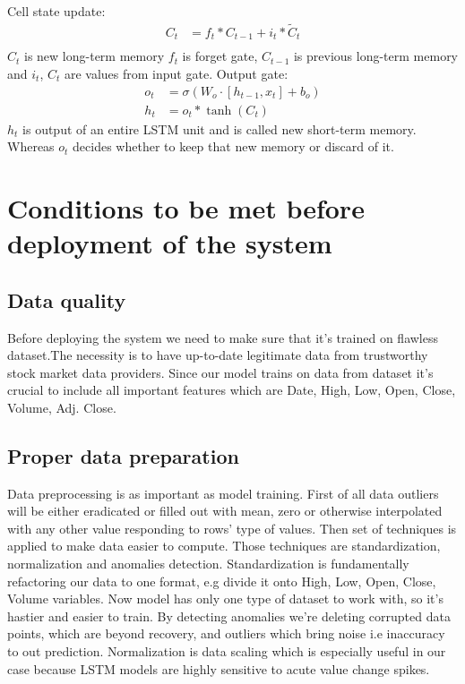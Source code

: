 \documentclass[10pt,twoside,english,a4paper]{article}
\begin{document}
\newline Cell state update:
\begin{align*}
    C_t &= f_t * C_{t-1} + i_t * \tilde{C}_t \\
\end{align*}
$C_t$ is new long-term memory $f_t$ is forget gate, $C_{t-1}$ is previous long-term memory and $i_t$, $C_t$ are values from input gate.
\newline Output gate:
\begin{align*}
    o_t &= \sigma(W_o \cdot [h_{t-1}, x_t] + b_o) \\
    h_t &= o_t * \tanh(C_t)
\end{align*}
$h_t$ is output of an entire LSTM unit and is called new short-term memory. Whereas $o_t$ decides whether to keep that new memory or discard of it.
\section{Conditions to be met before deployment of the system}
\subsection{Data quality}
Before deploying the system we need to make sure that it's trained on flawless dataset.The necessity is to have up-to-date legitimate data from trustworthy stock market data providers. Since our model trains on data from dataset it's crucial to include all important features which are Date, High, Low, Open, Close, Volume, Adj. Close.\cite{data_quality}
\subsection{Proper data preparation}
Data preprocessing is as important as model training. First of all data outliers will be either eradicated or filled out with mean, zero or otherwise interpolated with any other value responding to rows' type of values. Then set of techniques is applied to make data easier to compute. Those techniques are standardization, normalization and anomalies detection.
Standardization is fundamentally refactoring our data to one format, e.g divide it onto High, Low, Open, Close, Volume variables. Now model has only one type of dataset to work with, so it's hastier and easier to train. By detecting anomalies we're deleting corrupted data points, which are beyond recovery, and outliers which bring noise i.e inaccuracy to out prediction. Normalization is data scaling which is especially useful in our case because LSTM models are highly sensitive to acute value change spikes.\cite{data_preproc_feature_sel_time_updates}
\end{document}
